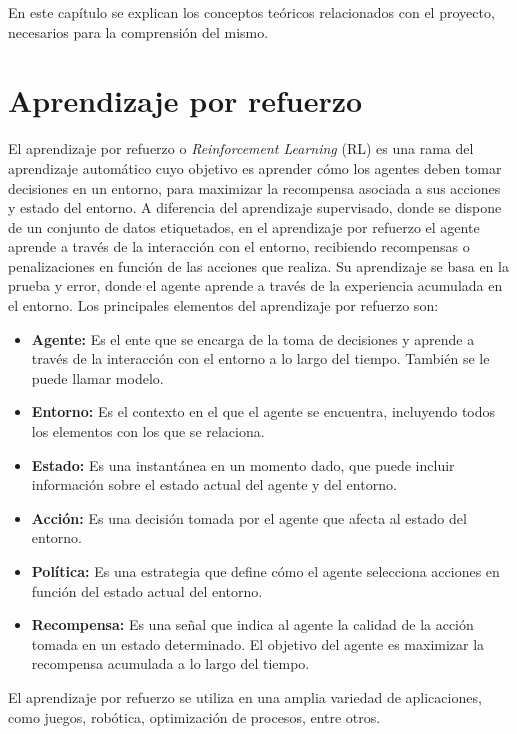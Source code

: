En este capítulo se explican los conceptos teóricos relacionados con el proyecto, necesarios para la comprensión del mismo.

\section{Aprendizaje por refuerzo}
El aprendizaje por refuerzo o \textit{Reinforcement Learning} (RL) es una rama del aprendizaje automático cuyo objetivo es aprender cómo los agentes deben tomar decisiones en un entorno, para maximizar la recompensa asociada a sus acciones y estado del entorno. A diferencia del aprendizaje supervisado, donde se dispone de un conjunto de datos etiquetados, en el aprendizaje por refuerzo el agente aprende a través de la interacción con el entorno, recibiendo recompensas o penalizaciones en función de las acciones que realiza. Su aprendizaje se basa en la prueba y error, donde el agente aprende a través de la experiencia acumulada en el entorno.
Los principales elementos del aprendizaje por refuerzo son:
\begin{itemize}
	\item \textbf{Agente:} Es el ente que se encarga de la toma de decisiones y aprende a través de la interacción con el entorno a lo largo del tiempo. También se le puede llamar modelo.
	\item \textbf{Entorno:} Es el contexto en el que el agente se encuentra, incluyendo todos los elementos con los que se relaciona.
	\item \textbf{Estado:} Es una instantánea en un momento dado, que puede incluir información sobre el estado actual del agente y del entorno.
	\item \textbf{Acción:} Es una decisión tomada por el agente que afecta al estado del entorno.
	\item \textbf{Política:} Es una estrategia que define cómo el agente selecciona acciones en función del estado actual del entorno.
	\item \textbf{Recompensa:} Es una señal que indica al agente la calidad de la acción tomada en un estado determinado. El objetivo del agente es maximizar la recompensa acumulada a lo largo del tiempo.
\end{itemize}

El aprendizaje por refuerzo se utiliza en una amplia variedad de aplicaciones, como juegos, robótica, optimización de procesos, entre otros.

